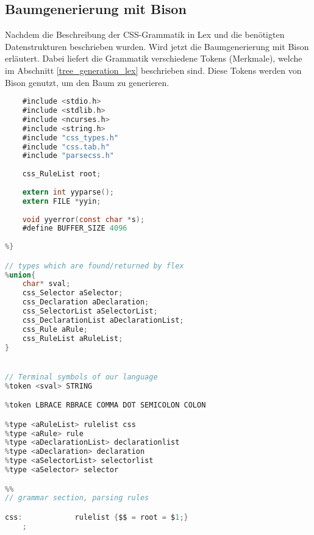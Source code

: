 \subsection{Baumgenerierung mit Bison}
Nachdem die Beschreibung der CSS-Grammatik in Lex und die benötigten Datenstrukturen beschrieben wurden. Wird jetzt die Baumgenerierung mit Bison erläutert. Dabei liefert die Grammatik verschiedene Tokens (Merkmale), welche im Abschnitt \ref{tree_generation_lex} beschrieben sind. Diese Tokens werden von Bison genutzt, um den Baum zu generieren. 
\begin{lstlisting}[label=css_bison,language=C, caption=Baumgenerierung mit Bison]
%{
    #include <stdio.h>
    #include <stdlib.h>
    #include <ncurses.h>
    #include <string.h>
    #include "css_types.h"
    #include "css.tab.h"
    #include "parsecss.h"
        
    css_RuleList root; 
	
    extern int yyparse();
    extern FILE *yyin;
    
    void yyerror(const char *s);
	#define BUFFER_SIZE 4096
	
%}

// types which are found/returned by flex 
%union{
    char* sval;
    css_Selector aSelector;
    css_Declaration aDeclaration;
    css_SelectorList aSelectorList;
    css_DeclarationList aDeclarationList;
    css_Rule aRule;
    css_RuleList aRuleList;
}


// Terminal symbols of our language
%token <sval> STRING

%token LBRACE RBRACE COMMA DOT SEMICOLON COLON

%type <aRuleList> rulelist css
%type <aRule> rule
%type <aDeclarationList> declarationlist
%type <aDeclaration> declaration
%type <aSelectorList> selectorlist
%type <aSelector> selector

%%
// grammar section, parsing rules

css:			rulelist {$$ = root = $1;}
	;


\end{lstlisting}

